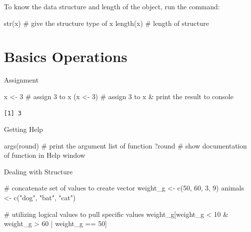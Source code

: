 \documentclass[
  letterpaper,
  DIV=11,
  numbers=noendperiod]{scrreprt}
\newenvironment{Shaded}{\begin{snugshade}}{\end{snugshade}}
\newcommand{\CommentTok}[1]{\textcolor[rgb]{0.37,0.37,0.37}{#1}}
\newcommand{\DecValTok}[1]{\textcolor[rgb]{0.68,0.00,0.00}{#1}}
\newcommand{\FunctionTok}[1]{\textcolor[rgb]{0.28,0.35,0.67}{#1}}
\newcommand{\NormalTok}[1]{\textcolor[rgb]{0.00,0.23,0.31}{#1}}
\newcommand{\OtherTok}[1]{\textcolor[rgb]{0.00,0.23,0.31}{#1}}
\newcommand{\SpecialCharTok}[1]{\textcolor[rgb]{0.37,0.37,0.37}{#1}}
\newcommand{\StringTok}[1]{\textcolor[rgb]{0.13,0.47,0.30}{#1}}
\begin{document}
To know the data structure and length of the object, run the command:

\begin{Shaded}
\begin{Highlighting}[]
\FunctionTok{str}\NormalTok{(x)      }\CommentTok{\# give the structure type of x}
\FunctionTok{length}\NormalTok{(x)   }\CommentTok{\# length of structure}
\end{Highlighting}
\end{Shaded}

\section{Basics Operations}\label{basics-operations}

Assignment

\begin{Shaded}
\begin{Highlighting}[]
\NormalTok{x }\OtherTok{\textless{}{-}} \DecValTok{3}      \CommentTok{\# assign 3 to x}
\NormalTok{(x }\OtherTok{\textless{}{-}} \DecValTok{3}\NormalTok{)    }\CommentTok{\# assign 3 to x \& print the result to console}
\end{Highlighting}
\end{Shaded}

\begin{verbatim}
[1] 3
\end{verbatim}

Getting Help

\begin{Shaded}
\begin{Highlighting}[]
\FunctionTok{args}\NormalTok{(round) }\CommentTok{\# print the argument list of function}
\NormalTok{?round        }\CommentTok{\# show documentation of function in Help window}
\end{Highlighting}
\end{Shaded}

Dealing with Structure

\begin{Shaded}
\begin{Highlighting}[]
\CommentTok{\# concatenate set of values to create vector}
\NormalTok{weight\_g }\OtherTok{\textless{}{-}} \FunctionTok{c}\NormalTok{(}\DecValTok{50}\NormalTok{, }\DecValTok{60}\NormalTok{, }\DecValTok{3}\NormalTok{, }\DecValTok{9}\NormalTok{)}
\NormalTok{animals }\OtherTok{\textless{}{-}} \FunctionTok{c}\NormalTok{(}\StringTok{"dog"}\NormalTok{, }\StringTok{"bat"}\NormalTok{, }\StringTok{"cat"}\NormalTok{)}

\CommentTok{\# utilizing logical values to pull specific values}
\NormalTok{weight\_g[weight\_g }\SpecialCharTok{\textless{}} \DecValTok{10} \SpecialCharTok{\&}\NormalTok{ weight\_g }\SpecialCharTok{\textgreater{}} \DecValTok{60} \SpecialCharTok{|}\NormalTok{ weight\_g }\SpecialCharTok{==} \DecValTok{50}\NormalTok{]}
\end{Highlighting}
\end{Shaded}
\end{document}

